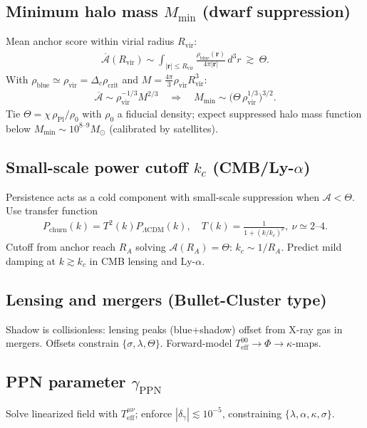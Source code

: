\documentclass[11pt]{article}
\newcommand{\Acal}{\mathcal{A}}
\begin{document}
\subsection[Minimum halo mass (dwarf suppression)]{Minimum halo mass $M_{\min}$ (dwarf suppression)}
Mean anchor score within virial radius $R_{\mathrm{vir}}$:
\begin{align}
\overline{\Acal}(R_{\mathrm{vir}})\sim \int_{|\mathbf r|\le R_{\mathrm{vir}}}\frac{\rho_{\mathrm{blue}}(\mathbf r)}{4\pi|\mathbf r|}\,d^3r \ \gtrsim\ \Theta.
\end{align}
With $\rho_{\mathrm{blue}}\simeq \rho_{\mathrm{vir}}=\Delta_c\rho_{\mathrm{crit}}$ and $M=\frac{4\pi}{3}\rho_{\mathrm{vir}}R_{\mathrm{vir}}^3$:
\begin{align}
\overline{\Acal}\sim \rho_{\mathrm{vir}}^{-1/3}M^{2/3}\quad\Rightarrow\quad M_{\min}\sim \big(\Theta\,\rho_{\mathrm{vir}}^{1/3}\big)^{3/2}.
\end{align}
Tie $\Theta=\chi\,\rho_{\mathrm{Pl}}/\rho_0$ with $\rho_0$ a fiducial density; expect suppressed halo mass function below $M_{\min}\sim 10^{8\text{--}9}M_\odot$ (calibrated by satellites).

\subsection[Small-scale power cutoff (CMB/Ly-alpha)]{Small-scale power cutoff $k_c$ (CMB/Ly-$\alpha$)}
Persistence acts as a cold component with small-scale suppression when $\Acal<\Theta$. Use transfer function
\begin{align}
P_{\mathrm{churn}}(k)=T^2(k)P_{\Lambda \mathrm{CDM}}(k),\quad T(k)=\frac{1}{1+(k/k_c)^\nu},\ \nu\simeq 2\text{--}4.
\end{align}
Cutoff from anchor reach $R_A$ solving $\Acal(R_A)=\Theta$: $k_c\sim 1/R_A$. Predict mild damping at $k\gtrsim k_c$ in CMB lensing and Ly-$\alpha$.

\subsection{Lensing and mergers (Bullet-Cluster type)}
Shadow is collisionless: lensing peaks (blue+shadow) offset from X-ray gas in mergers. Offsets constrain $\{\sigma,\lambda,\Theta\}$. Forward-model $T^{00}_{\mathrm{eff}}\to \Phi\to \kappa$-maps.

\subsection[PPN parameter gamma]{PPN parameter $\gamma_{\mathrm{PPN}}$}
Solve linearized field with $T^{\mu\nu}_{\mathrm{eff}}$; enforce $|\delta_\gamma|\lesssim 10^{-5}$, constraining $\{\lambda,\alpha,\kappa,\sigma\}$.
\end{document}
